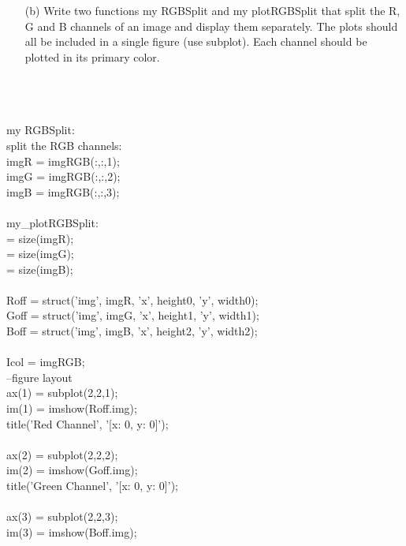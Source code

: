         \\\\
    \begin{enumerate}        
        \item[(b)] Write two functions my RGBSplit and my plotRGBSplit that split the R, G and B channels of an image and display them separately. The plots should all be included in a single figure (use subplot). Each channel should be plotted in its primary color.
    \end{enumerate}
        \\\\
        \\ my RGBSplit:
        \\ split the RGB channels:
        \\ imgR = imgRGB(:,:,1);
        \\ imgG = imgRGB(:,:,2);
        \\ imgB = imgRGB(:,:,3);
        \\
        \\ my_plotRGBSplit:
        \\ [height0 , width0] = size(imgR);
        \\ [height1 , width1] = size(imgG);
        \\ [height2 , width2] = size(imgB);
        \\
        \\ Roff = struct('img', imgR, 'x', height0, 'y', width0);
        \\ Goff = struct('img', imgG, 'x', height1, 'y', width1);
        \\ Boff = struct('img', imgB, 'x', height2, 'y', width2);
        \\
        \\ Icol = imgRGB;
        \\ --figure layout
        \\ ax(1) = subplot(2,2,1);
        \\ im(1) = imshow(Roff.img);
        \\ title({'Red Channel', '[x: 0, y: 0]'});
        \\
        \\ ax(2) = subplot(2,2,2);
        \\ im(2) = imshow(Goff.img);
        \\ title({'Green Channel', '[x: 0, y: 0]'});
        \\
        \\ ax(3) = subplot(2,2,3);
        \\ im(3) = imshow(Boff.img);
